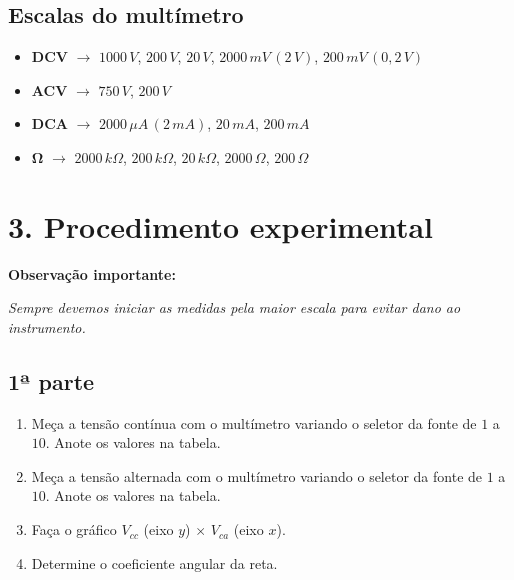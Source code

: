 \documentclass[a4paper,12pt]{article}
\begin{document}
\subsection*{Escalas do multímetro}
\begin{itemize}[leftmargin=2em]
    \item \textbf{DCV} $\rightarrow$ $1000\,V$, $200\,V$, $20\,V$, $2000\,mV\,(2\,V)$, $200\,mV\,(0{,}2\,V)$
    \item \textbf{ACV} $\rightarrow$ $750\,V$, $200\,V$
    \item \textbf{DCA} $\rightarrow$ $2000\,\mu A\,(2\,mA)$, $20\,mA$, $200\,mA$
    \item $\boldsymbol{\Omega}$ $\rightarrow$ $2000\,k\Omega$, $200\,k\Omega$, $20\,k\Omega$, $2000\,\Omega$, $200\,\Omega$
\end{itemize}

\newpage

\section*{3. Procedimento experimental}

\textbf{Observação importante:}

\textit{Sempre devemos iniciar as medidas pela maior escala para evitar dano ao instrumento.}

\subsection*{1ª parte}
\begin{enumerate}[leftmargin=2em, label=\arabic*)]
    \item Meça a tensão contínua com o multímetro variando o seletor da fonte de $1$ a $10$.  
    Anote os valores na tabela.

    \item Meça a tensão alternada com o multímetro variando o seletor da fonte de $1$ a $10$.  
    Anote os valores na tabela.

    \item Faça o gráfico $V_{cc}$ (eixo $y$) $\times$ $V_{ca}$ (eixo $x$).

    \item Determine o coeficiente angular da reta.
\end{enumerate}
\end{document}
